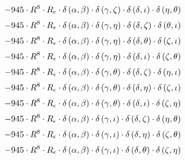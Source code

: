 \begin{subequations}
\begin{gather}
 \\[0.2em] \notag 		 - 945 \cdot R^{8} \cdot R_{\epsilon{}} \cdot \delta{}\left(\alpha{}, \beta{}\right) \cdot \delta{}\left(\gamma{}, \zeta{}\right) \cdot \delta{}\left(\delta{}, \iota{}\right) \cdot \delta{}\left(\eta{}, \theta{}\right) 
 \\[0.2em] \notag 		 - 945 \cdot R^{8} \cdot R_{\epsilon{}} \cdot \delta{}\left(\alpha{}, \beta{}\right) \cdot \delta{}\left(\gamma{}, \eta{}\right) \cdot \delta{}\left(\delta{}, \zeta{}\right) \cdot \delta{}\left(\theta{}, \iota{}\right) 
 \\[0.2em] \notag 		 - 945 \cdot R^{8} \cdot R_{\epsilon{}} \cdot \delta{}\left(\alpha{}, \beta{}\right) \cdot \delta{}\left(\gamma{}, \eta{}\right) \cdot \delta{}\left(\delta{}, \theta{}\right) \cdot \delta{}\left(\zeta{}, \iota{}\right) 
 \\[0.2em] \notag 		 - 945 \cdot R^{8} \cdot R_{\epsilon{}} \cdot \delta{}\left(\alpha{}, \beta{}\right) \cdot \delta{}\left(\gamma{}, \eta{}\right) \cdot \delta{}\left(\delta{}, \iota{}\right) \cdot \delta{}\left(\zeta{}, \theta{}\right) 
 \\[0.2em] \notag 		 - 945 \cdot R^{8} \cdot R_{\epsilon{}} \cdot \delta{}\left(\alpha{}, \beta{}\right) \cdot \delta{}\left(\gamma{}, \theta{}\right) \cdot \delta{}\left(\delta{}, \zeta{}\right) \cdot \delta{}\left(\eta{}, \iota{}\right) 
 \\[0.2em] \notag 		 - 945 \cdot R^{8} \cdot R_{\epsilon{}} \cdot \delta{}\left(\alpha{}, \beta{}\right) \cdot \delta{}\left(\gamma{}, \theta{}\right) \cdot \delta{}\left(\delta{}, \eta{}\right) \cdot \delta{}\left(\zeta{}, \iota{}\right) 
 \\[0.2em] \notag 		 - 945 \cdot R^{8} \cdot R_{\epsilon{}} \cdot \delta{}\left(\alpha{}, \beta{}\right) \cdot \delta{}\left(\gamma{}, \theta{}\right) \cdot \delta{}\left(\delta{}, \iota{}\right) \cdot \delta{}\left(\zeta{}, \eta{}\right) 
 \\[0.2em] \notag 		 - 945 \cdot R^{8} \cdot R_{\epsilon{}} \cdot \delta{}\left(\alpha{}, \beta{}\right) \cdot \delta{}\left(\gamma{}, \iota{}\right) \cdot \delta{}\left(\delta{}, \zeta{}\right) \cdot \delta{}\left(\eta{}, \theta{}\right) 
 \\[0.2em] \notag 		 - 945 \cdot R^{8} \cdot R_{\epsilon{}} \cdot \delta{}\left(\alpha{}, \beta{}\right) \cdot \delta{}\left(\gamma{}, \iota{}\right) \cdot \delta{}\left(\delta{}, \eta{}\right) \cdot \delta{}\left(\zeta{}, \theta{}\right) 
 \\[0.2em] \notag 		 - 945 \cdot R^{8} \cdot R_{\epsilon{}} \cdot \delta{}\left(\alpha{}, \beta{}\right) \cdot \delta{}\left(\gamma{}, \iota{}\right) \cdot \delta{}\left(\delta{}, \theta{}\right) \cdot \delta{}\left(\zeta{}, \eta{}\right) 

\end{gather}
\end{subequations}
